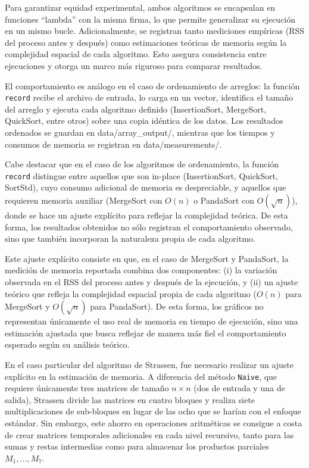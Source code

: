 Para garantizar equidad experimental, ambos algoritmos se encapsulan en funciones 
``lambda'' con la misma firma, lo que permite generalizar su ejecución en un mismo bucle. 
Adicionalmente, se registran tanto mediciones empíricas (RSS del proceso antes y después) 
como estimaciones teóricas de memoria según la complejidad espacial de cada algoritmo. 
Esto asegura consistencia entre ejecuciones y otorga un marco más riguroso para comparar 
resultados.

El comportamiento es análogo en el caso de ordenamiento de arreglos: la función 
\texttt{record} recibe el archivo de entrada, lo carga en un vector, identifica el tamaño 
del arreglo y ejecuta cada algoritmo definido (InsertionSort, MergeSort, QuickSort, 
entre otros) sobre una copia idéntica de los datos. Los resultados ordenados se guardan 
en \textsf{data/array\_output/}, mientras que los tiempos y consumos de memoria se 
registran en \textsf{data/measurements/}. 

Cabe destacar que en el caso de los algoritmos de ordenamiento, la función \texttt{record} 
distingue entre aquellos que son in-place (InsertionSort, QuickSort, SortStd), cuyo consumo 
adicional de memoria es despreciable, y aquellos que requieren memoria auxiliar 
(MergeSort con $O(n)$ o PandaSort con $O(\sqrt{n})$), donde se hace un ajuste explícito 
para reflejar la complejidad teórica. De esta forma, los resultados obtenidos no sólo 
registran el comportamiento observado, sino que también incorporan la naturaleza propia 
de cada algoritmo.

Este ajuste explícito consiste en que, en el caso de MergeSort y PandaSort, la medición de memoria reportada combina 
dos componentes: (i) la variación observada en el RSS del proceso antes y después de la ejecución, 
y (ii) un ajuste teórico que refleja la complejidad espacial propia de cada algoritmo 
($O(n)$ para MergeSort y $O(\sqrt{n})$ para PandaSort). 
De esta forma, los gráficos no representan únicamente el uso real de memoria en tiempo de ejecución, 
sino una estimación ajustada que busca reflejar de manera más fiel el comportamiento esperado según su análisis teórico.


En el caso particular del algoritmo de Strassen, fue necesario realizar un ajuste explícito en 
la estimación de memoria. A diferencia del método \texttt{Naive}, que requiere únicamente 
tres matrices de tamaño $n \times n$ (dos de entrada y una de salida), Strassen divide las 
matrices en cuatro bloques y realiza siete multiplicaciones de sub-bloques en lugar de las 
ocho que se harían con el enfoque estándar. Sin embargo, este ahorro en operaciones aritméticas 
se consigue a costa de crear matrices temporales adicionales en cada nivel recursivo, 
tanto para las sumas y restas intermedias como para almacenar los productos parciales $M_1,\dots,M_7$.

